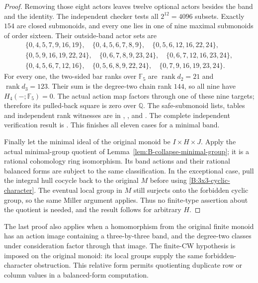 \begin{proof}
Removing those eight actors leaves twelve optional actors besides
the band and the identity.  The independent checker tests all
$2^{12}=4096$ subsets.  Exactly $154$ are closed submonoids, and
every one lies in one of nine maximal submonoids of order sixteen.
Their outside-band actor sets are
\[
\begin{gathered}
\{0,4,5,7,9,16,19\},\quad
\{0,4,5,6,7,8,9\},\quad
\{0,5,6,12,16,22,24\},\\
\{0,5,9,16,19,22,24\},\quad
\{0,6,7,8,9,23,24\},\quad
\{0,6,7,12,16,23,24\},\\
\{0,4,5,6,7,12,16\},\quad
\{0,5,6,8,9,22,24\},\quad
\{0,7,9,16,19,23,24\}.
\end{gathered}
\]
For every one, the two-sided bar ranks over $\mathbb F_5$ are
$\operatorname{rank}d_2=21$ and
$\operatorname{rank}d_3=123$.  Their sum is the degree-two chain
rank $144$, so all nine have $H_4(-;\mathbb F_5)=0$.
The actual action map factors through one of these nine targets;
therefore its pulled-back square is zero over $\mathbb Q$.
The safe-submonoid lists, tables and independent rank witnesses are
in ,
, and
.
The complete independent verification result is
.
This finishes all eleven cases for a minimal band.

Finally let the minimal ideal of the original monoid be
$I\times H\times J$.  Apply the actual minimal-group quotient of
Lemma~\ref{lem:B-collapse-minimal-group}; it is a rational cohomology
ring isomorphism.  Its band actions and their rational balanced forms
are subject to the same classification.  In the exceptional case,
pull the integral hull cocycle back to the original $M$ before using
\eqref{B:3x3-cyclic-character}.  The eventual local group in $M$
still surjects onto the forbidden cyclic group, so the same Miller
argument applies.  Thus no finite-type assertion about the quotient
is needed, and the result follows for arbitrary $H$.
\end{proof}

\begin{remark}\label{B:three-by-three-relative}
The last proof also applies when a homomorphism from the original
finite monoid has an action image containing a three-by-three band,
and the degree-two classes under consideration factor through that
image.  The finite-CW hypothesis is imposed on the original monoid:
its local groups supply the same forbidden-character obstruction.
This relative form permits quotienting duplicate row or column
values in a balanced-form computation.
\end{remark}
